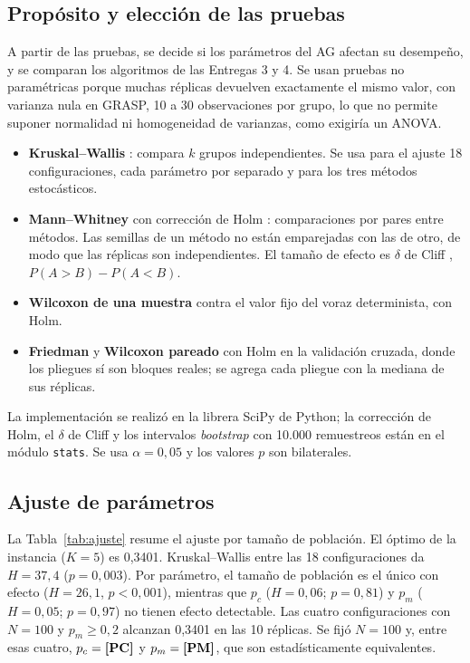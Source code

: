\documentclass[conference]{IEEEtran}
\begin{document}
	\subsection{Prop\'osito y elecci\'on de las pruebas}
	A partir de las pruebas, se decide si los par\'ametros del AG afectan su desempeño, y se comparan los algoritmos de las Entregas 3 y 4. Se usan pruebas no param\'etricas porque muchas r\'eplicas devuelven exactamente el mismo valor, con varianza nula en GRASP, 10 a 30 observaciones por grupo, lo que no permite suponer normalidad ni homogeneidad de varianzas, como exigir\'ia un ANOVA.
	\begin{itemize}
		\item \textbf{Kruskal--Wallis} \cite{kruskal}: compara $k$ grupos independientes. Se usa para el ajuste 18 configuraciones, cada par\'ametro por separado y para los tres m\'etodos estoc\'asticos.
		\item \textbf{Mann--Whitney} \cite{mann} con correcci\'on de Holm \cite{holm}: comparaciones por pares entre m\'etodos. Las semillas de un m\'etodo no est\'an emparejadas con las de otro, de modo que las r\'eplicas son independientes. El tama\~no de efecto es $\delta$ de Cliff \cite{cliff}, $P(A>B)-P(A<B)$.
		\item \textbf{Wilcoxon de una muestra} contra el valor fijo del voraz determinista, con Holm.
		\item \textbf{Friedman} \cite{friedman,demsar} y \textbf{Wilcoxon pareado} con Holm en la validaci\'on cruzada, donde los pliegues s\'i son bloques reales; se agrega cada pliegue con la mediana de sus r\'eplicas.
	\end{itemize}
	La implementación se realizó en la librera SciPy \cite{scipy} de Python; la correcci\'on de Holm, el $\delta$ de Cliff y los intervalos \emph{bootstrap} con 10.000 remuestreos est\'an en el m\'odulo \texttt{stats}. Se usa $\alpha=0{,}05$ y los valores $p$ son bilaterales.
	
	\subsection{Ajuste de par\'ametros}
	La Tabla~\ref{tab:ajuste} resume el ajuste por tama\~no de poblaci\'on. El \'optimo de la instancia ($K=5$) es 0,3401. Kruskal--Wallis entre las 18 configuraciones da $H=37{,}4$ ($p=0{,}003$). Por par\'ametro, el tama\~no de poblaci\'on es el \'unico con efecto ($H=26{,}1$, $p<0{,}001$), mientras que $p_c$ ($H=0{,}06$; $p=0{,}81$) y $p_m$ ($H=0{,}05$; $p=0{,}97$) no tienen efecto detectable. Las cuatro configuraciones con $N=100$ y $p_m\ge0{,}2$ alcanzan 0,3401 en las 10 r\'eplicas. Se fij\'o $N=100$ y, entre esas cuatro, $p_c=\textbf{[PC]}$ y $p_m=\textbf{[PM]}$, que son estad\'isticamente equivalentes.
	
\end{document}

